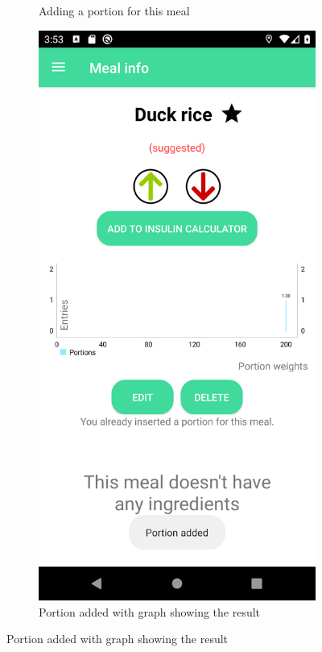 \begin{figure}[H]
\begin{center}
\begin{subfigure}{.3\textwidth}
            \caption{Adding a portion for this meal} 
        \end{subfigure}%
        \begin{subfigure}{.3\textwidth}
            \includegraphics[scale=0.1, width=\textwidth]{_figures/portion_added.png}
            \caption{Portion added with graph showing the result} 
        \end{subfigure}%
    \end{center}
\end{figure}

